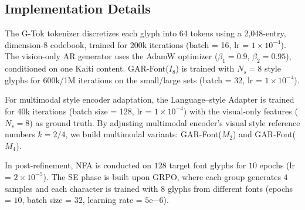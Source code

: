 \subsection{Implementation Details}
The G-Tok tokenizer discretizes each glyph into 64 tokens using a 2,048-entry, dimension-8 codebook, trained for 200k iterations (batch = 16, lr = $1{\times}10^{-4}$). The vision-only AR generator uses the AdamW optimizer ($\beta_1 = 0.9$, $\beta_2 = 0.95$), conditioned on one Kaiti content. GAR-Font($I_8$) is trained with $N_s=8$ style glyphs for 600k/1M iterations on the small/large sets (batch = 32, lr = $1{\times}10^{-4}$).

For multimodal style encoder adaptation, the Language–style Adapter is trained for 40k iterations (batch size = 128, lr = $1{\times}10^{-4}$) with the visual-only features ($N_s=8$) as ground truth. By adjusting multimodal encoder's visual style reference numbers $k=2/4$, we build multimodal variants: GAR-Font($M_2$) and GAR-Font($M_4$).

In post-refinement, NFA is conducted on $128$ target font glyphs for $10$ epochs (lr = $2{\times}10^{-5}$). The SE phase is built upon GRPO, where each group generates $4$ samples and each character is trained with $8$ glyphs from different fonts (epochs = $10$, batch size = $32$, learning rate = $5\mathrm {e}{-6}$). 



